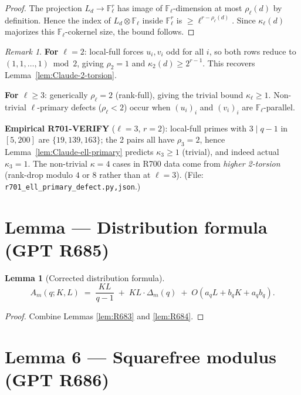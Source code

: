 \documentclass[12pt]{amsart}
\newtheorem{lemma}{Lemma}
\theoremstyle{definition}
\theoremstyle{remark}
\newtheorem{remark}{Remark}
\begin{document}
\begin{proof}
The projection $L_d \to \mathbb{F}_\ell^r$ has image of $\mathbb{F}_\ell$-dimension at most $\rho_\ell(d)$ by definition. Hence the index of $L_d \otimes \mathbb{F}_\ell$ inside $\mathbb{F}_\ell^r$ is $\ge \ell^{r - \rho_\ell(d)}$. Since $\kappa_\ell(d)$ majorizes this $\mathbb{F}_\ell$-cokernel size, the bound follows.
\end{proof}

\begin{remark}
\textbf{For $\ell = 2$}: local-full forces $u_i, v_i$ odd for all $i$, so both rows reduce to $(1, 1, \ldots, 1) \bmod 2$, giving $\rho_2 = 1$ and $\kappa_2(d) \ge 2^{r-1}$. This recovers Lemma~\ref{lem:Claude-2-torsion}.

\textbf{For $\ell \ge 3$}: generically $\rho_\ell = 2$ (rank-full), giving the trivial bound $\kappa_\ell \ge 1$. Non-trivial $\ell$-primary defects ($\rho_\ell < 2$) occur when $(u_i)_i$ and $(v_i)_i$ are $\mathbb{F}_\ell$-parallel.

\textbf{Empirical R701-VERIFY} ($\ell = 3$, $r = 2$): local-full primes with $3 \mid q-1$ in $[5, 200]$ are $\{19, 139, 163\}$; the 2 pairs all have $\rho_3 = 2$, hence Lemma~\ref{lem:Claude-ell-primary} predicts $\kappa_3 \ge 1$ (trivial), and indeed actual $\kappa_3 = 1$. The non-trivial $\kappa = 4$ cases in R700 data come from \emph{higher 2-torsion} (rank-drop modulo $4$ or $8$ rather than at $\ell = 3$). \hfill(File: \texttt{r701\_ell\_primary\_defect.{py,json}}.)
\end{remark}

\section{Lemma --- Distribution formula (GPT R685)}

\begin{lemma}[Corrected distribution formula]\label{lem:R685}
$$
A_m(q; K, L)
\;=\;
\frac{KL}{q - 1}
\;+\;
KL \cdot \Delta_m(q)
\;+\;
O(a_q L + b_q K + a_q b_q).
$$
\end{lemma}

\begin{proof}
Combine Lemmas \ref{lem:R683} and \ref{lem:R684}.
\end{proof}

\section{Lemma 6 --- Squarefree modulus (GPT R686)}
\end{document}
